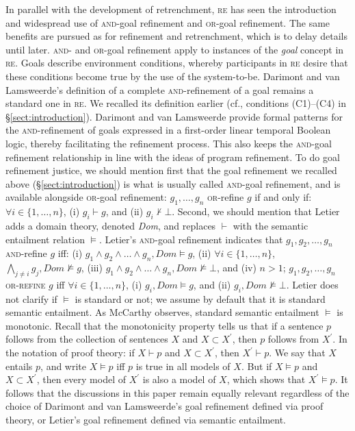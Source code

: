 \documentclass[10pt, conference, compsocconf]{IEEEtran}
\begin{document}
In parallel with the development of retrenchment, \textsc{re} has seen the introduction and widespread use of \textsc{and}-goal refinement and \textsc{or}-goal refinement. The same benefits are pursued as for refinement and retrenchment, which is to delay details until later. \textsc{and}- and \textsc{or}-goal refinement apply to instances of the \textit{goal} concept in \textsc{re}. Goals describe environment conditions, whereby participants in \textsc{re} desire that these conditions become true by the use of the system-to-be. Darimont and van Lamsweerde's \cite{Darimont+:1996:FSE} definition of a complete \textsc{and}-refinement of a goal remains a standard one in \textsc{re}. We recalled its definition earlier (cf., conditions (C1)--(C4) in \S\ref{sect:introduction}). Darimont and van Lamsweerde provide formal patterns for the \textsc{and}-refinement of goals expressed in a first-order linear temporal Boolean logic, thereby facilitating the refinement process. This also keeps the \textsc{and}-goal refinement relationship in line with the ideas of program refinement. To do goal refinement justice, we should mention first that the goal refinement we recalled above (\S\ref{sect:introduction}) is what is usually called \textsc{and}-goal refinement, and is available alongside \textsc{or}-goal refinement: $g_{1}, \ldots, g_{n}$ \textsc{or}-refine $g$ if and only if: $\forall i \in \{1, \ldots, n\}$, (i) $g_{i} \vdash g$, and (ii) $g_{i} \not\vdash \bot$. Second, we should mention that Letier \cite{Letier:2001:PHD} adds a domain theory, denoted \textit{Dom}, and replaces $\vdash$ with the semantic entailment relation $\models$. Letier's \textsc{and}-goal refinement indicates that $g_{1}, g_{2}, \ldots, g_{n}$ \textsc{and}-refine $g$ iff: (i) $g_{1} \wedge g_{2} \wedge \ldots \wedge g_{n}, \textit{Dom} \models g$, (ii) $\forall i \in \{1, \ldots, n\}$, $\bigwedge_{j \neq i} g_{j}, \textit{Dom} \not\models g$, (iii) $g_{1} \wedge g_{2} \wedge \ldots \wedge g_{n}, \textit{Dom} \not\models \bot$, and (iv) $n > 1$; $g_{1}, g_{2}, \ldots, g_{n}$ \textsc{or-refine} $g$ iff $\forall i \in \{1, \ldots, n\}$, (i) $g_{i}, \textit{Dom} \models g$, and (ii) $g_{i}, \textit{Dom} \not\models \bot$. Letier does not clarify if $\models$ is standard or not; we assume by default that it is standard semantic entailment. As McCarthy \cite{McCarthy:1980:AIJ} observes, standard semantic entailment $\models$ is monotonic. Recall that the monotonicity property tells us that if a sentence $p$ follows from the collection of sentences $X$ and $X \subset X^{\prime}$, then $p$ follows from $X^{\prime}$. In the notation of proof theory: if $X \vdash p$ and $X \subset X^{\prime}$, then $X^{\prime} \vdash p$. We say that $X$ entails $p$, and write $X \models p$ iff $p$ is true in all models of $X$. But if $X \models p$ and $X \subset X^{\prime}$, then every model of $X^{\prime}$ is also a model of $X$, which shows that $X^{\prime} \models p$. It follows that the discussions in this paper remain equally relevant regardless of the choice of Darimont and van Lamsweerde's goal refinement defined via proof theory, or Letier's goal refinement defined via semantic entailment.
\end{document}
